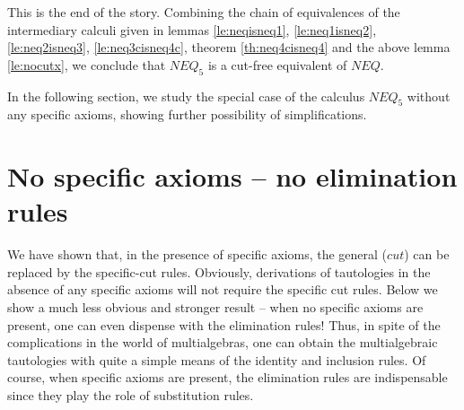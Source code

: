 This is the end of the story. Combining the chain of equivalences of the
intermediary calculi given in lemmas \ref{le:neqisneq1}, \ref{le:neq1isneq2},
\ref{le:neq2isneq3}, \ref{le:neq3cisneq4c}, theorem \ref{th:neq4cisneq4} and
the above lemma \ref{le:nocutx}, we conclude that $NEQ_5$ is a cut-free
equivalent of $NEQ$.

In the following section, we study the special case of the calculus
$NEQ_5$ without any specific axioms, showing further possibility of
simplifications. 

\section{No specific axioms -- no elimination rules}
We have shown that, in the presence of specific axioms, the general ($cut$)
can be replaced by the specific-cut rules. 
Obviously, derivations of tautologies in the absence of any specific axioms
will not require the specific cut rules. Below we show a much less obvious
and stronger result
-- when no specific axioms are present, 
one can even dispense with the elimination rules! Thus, in spite of the
complications in the world of multialgebras, one can
obtain the multialgebraic tautologies with quite a simple means of the identity
and inclusion rules. Of course, when specific axioms are present, the
elimination rules are indispensable since they play the role of substitution rules.

